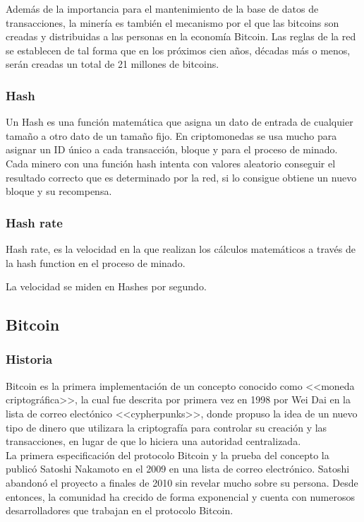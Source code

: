 \documentclass[12pt,letterpaper]{article}
\begin{document}
Adem\'as de la importancia para el mantenimiento de la base de datos de transacciones, la miner\'ia es tambi\'en el mecanismo por el que las bitcoins son creadas y distribuidas a las personas en la econom\'ia Bitcoin. Las reglas de la red se establecen de tal forma que en los pr\'oximos cien años, d\'ecadas m\'as o menos, ser\'an creadas un total de 21 
millones de bitcoins. 
\\

\subsubsection*{Hash}
Un Hash es una función matemática que asigna un dato de entrada de cualquier tamaño a otro dato de un tamaño fijo. En criptomonedas se usa mucho para asignar un ID único a cada transacción, bloque y para el proceso de minado. Cada minero con una función hash intenta con valores aleatorio conseguir el resultado correcto que es determinado por la red, si lo consigue obtiene un nuevo bloque y su recompensa.

	
    \subsubsection*{Hash rate}
    Hash rate, es la velocidad en la que realizan los cálculos matemáticos a través de la hash function en el proceso de minado.

La velocidad se miden en Hashes por segundo.

	\subsection*{Bitcoin}
        \subsubsection*{Historia}
        
Bitcoin es la primera implementaci\'on de un concepto conocido como <<moneda criptogr\'afica>>, la cual fue descrita por primera vez en 1998 por Wei Dai en la lista de correo elect\'onico <<cypherpunks>>, donde propuso la idea de un nuevo tipo de dinero que utilizara la criptograf\'ia para controlar su creaci\'on y las transacciones, en lugar de que lo hiciera una autoridad centralizada.
\\

 La primera especificaci\'on del protocolo Bitcoin y la prueba del concepto la public\'o Satoshi Nakamoto en el 2009 en una lista de correo electr\'onico. Satoshi abandon\'o el proyecto a finales de 2010 sin revelar mucho sobre su persona. Desde entonces, la comunidad ha crecido de forma exponencial y cuenta con numerosos desarrolladores que trabajan en el protocolo Bitcoin.
\\
\end{document}
